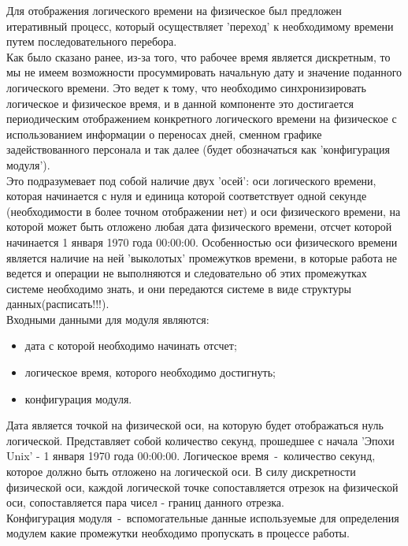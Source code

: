 \indent Для отображения логического времени на физическое был предложен итеративный процесс, который осуществляет 'переход' к необходимому времени путем последовательного перебора.\\
\indent Как было сказано ранее, из-за того, что рабочее время является дискретным, то мы не имеем возможности просуммировать начальную дату и значение поданного логического времени. 
Это ведет к тому, что необходимо синхронизировать логическое и физическое время, и в данной компоненте это достигается периодическим отображением конкретного логического времени на физическое с использованием информации о переносах дней, сменном графике задействованного персонала и так далее (будет обозначаться как 'конфигурация модуля').\\
\indent Это подразумевает под собой наличие двух 'осей': оси логического времени, которая начинается с нуля и единица которой соответствует одной секунде (необходимости в более точном отображении нет) и оси физического времени, на которой может быть отложено любая дата физического времени, отсчет которой начинается 1 января 1970 года 00:00:00. 
Особенностью оси физического времени является наличие на ней 'выколотых' промежутков времени, в которые работа не ведется и операции не выполняются и следовательно об этих промежутках системе необходимо знать, и они передаются системе в виде структуры данных(расписать!!!).\\
\indent Входными данными для модуля являются:
\begin{itemize}
	\item дата с которой необходимо начинать отсчет;
	\item логическое время, которого необходимо достигнуть;
	\item конфигурация модуля.
\end{itemize}
\indent Дата является точкой на физической оси, на которую будет отображаться нуль логической. Представляет собой количество секунд, прошедшее с начала 'Эпохи Unix' - 1 января 1970 года 00:00:00.
\indent Логическое время~-~количество секунд, которое должно быть отложено на логической оси. В силу дискретности физической оси, каждой логической точке сопоставляется отрезок на физической оси, сопоставляется пара чисел - границ данного отрезка.\\
\indent Конфигурация модуля~-~вспомогательные данные используемые для определения модулем какие промежутки необходимо пропускать в процессе работы. 

